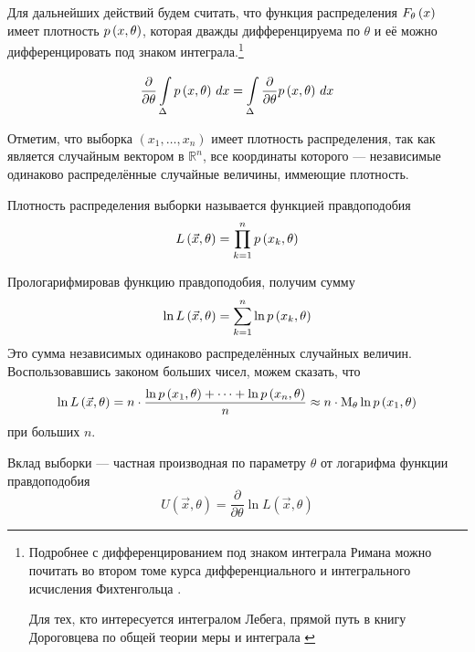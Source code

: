 \begin{remark}\label{remark:doubleDiff}
  Для дальнейших действий будем считать, что функция распределения
  $\cdfof{\theta}{x}$ имеет плотность $\pdf{x,\theta}$,
  которая дважды дифференцируема по $\theta$ и её можно дифференцировать под
  знаком интеграла.\footnote{Подробнее с дифференцированием под знаком
  интеграла Римана можно почитать во втором томе курса дифференциального и
  интегрального исчисления Фихтенгольца
  \cite[с.~712]{Fichtenholz2}.

  Для тех, кто интересуется интегралом Лебега, прямой путь в книгу
  Дороговцева по общей теории меры и интеграла \cite[с.~102]{DorogovtsevIT}}

  \begin{equation*}
    \frac{\partial}{\partial \theta}\integrall{\Delta}{dx}{\pdf{x, \theta}}
    = \integrall{\Delta}{dx}{\frac{\partial}{\partial \theta}\pdf{x, \theta}}
  \end{equation*}
\end{remark}

Отметим, что выборка $\left( x_1, \dots, x_n \right)$ имеет плотность
распределения, так как является случайным вектором в $\mathbb{R}^n$,
все координаты которого --- независимые одинаково распределённые случайные
величины, иммеющие плотность.

\begin{definition}
  \label{def:likehoodFunction}
  Плотность распределения выборки называется функцией правдоподобия
  \begin{equation*}
    L\left( \vec{x}, \theta \right) = \prod_{k=1}^n \pdf{x_k, \theta}
  \end{equation*}
\end{definition}

Прологарифмировав функцию правдоподобия, получим сумму
\begin{equation*}
  \ln{L\left( \vec{x}, \theta \right)}
  = \sum_{k=1}^n \ln{\pdf{x_k, \theta}}
\end{equation*}
Это сумма независимых одинаково распределённых случайных величин.
Воспользовавшись законом больших чисел, можем сказать,
что
\begin{equation*}
  \ln{L\left( \vec{x}, \theta \right)}
  = n \cdot \frac{\ln{\pdf{x_1, \theta}} + \dots + \ln{\pdf{x_n, \theta}}}{n}
  \approx n \cdot \meanof{\theta}{\ln{\pdf{x_1, \theta}}}
\end{equation*}
при больших $n$.


\begin{definition}\label{def:defU}
  Вклад выборки --- частная производная по параметру $\theta$
  от логарифма функции правдоподобия
  $$U\left( \vec{x},\theta \right)
      = \frac{\partial}{\partial\theta}\ln{L\left(\vec{x},\theta\right)}$$
\end{definition}

